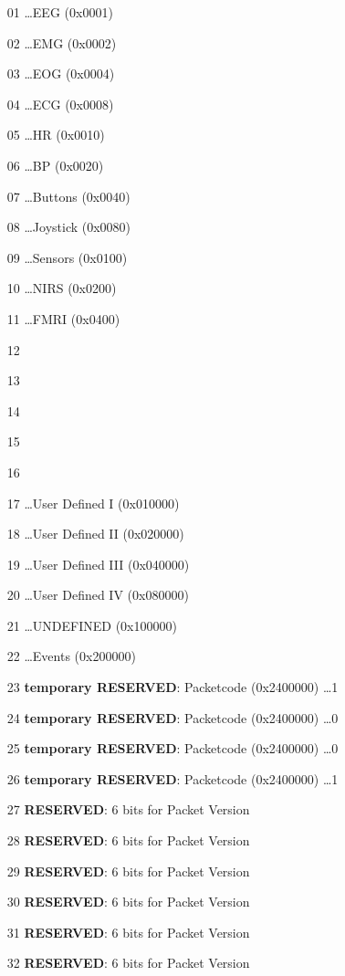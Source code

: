 \documentclass[11pt]{scrartcl}
\begin{document}
  \begin{itemize}
    \item[01]  \ldots EEG (0x0001)
    \item[02]  \ldots EMG (0x0002)
    \item[03]  \ldots EOG (0x0004)
    \item[04]  \ldots ECG (0x0008)
    \item[05]  \ldots HR  (0x0010)
    \item[06]  \ldots BP  (0x0020)
    \item[07]  \ldots Buttons  (0x0040)
    \item[08]  \ldots Joystick (0x0080)
    \item[09]  \ldots Sensors  (0x0100)
    \item[10]  \ldots NIRS     (0x0200)
    \item[11]  \ldots FMRI     (0x0400)
    \item[12]
    \item[13]
    \item[14]
    \item[15]
    \item[16]
    \item[17]  \ldots User Defined I    (0x010000)
    \item[18]  \ldots User Defined II   (0x020000)
    \item[19]  \ldots User Defined III  (0x040000)
    \item[20]  \ldots User Defined IV   (0x080000)
    \item[21]  \ldots UNDEFINED         (0x100000)
    \item[22]  \ldots Events            (0x200000)
    \item []
    \item[23]  \textbf{temporary RESERVED}: Packetcode (0x2400000) \ldots 1
    \item[24]  \textbf{temporary RESERVED}: Packetcode (0x2400000) \ldots 0
    \item[25]  \textbf{temporary RESERVED}: Packetcode (0x2400000) \ldots 0
    \item[26]  \textbf{temporary RESERVED}: Packetcode (0x2400000) \ldots 1
    \item []
    \item[27]  \textbf{RESERVED}: 6 bits for Packet Version
    \item[28]  \textbf{RESERVED}: 6 bits for Packet Version
    \item[29]  \textbf{RESERVED}: 6 bits for Packet Version
    \item[30]  \textbf{RESERVED}: 6 bits for Packet Version
    \item[31]  \textbf{RESERVED}: 6 bits for Packet Version
    \item[32]  \textbf{RESERVED}: 6 bits for Packet Version
  \end{itemize}
\end{document}
